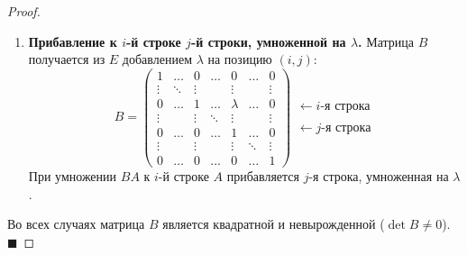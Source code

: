 \begin{proof}
\begin{enumerate}
    \item \textbf{Прибавление к $i$-й строке $j$-й строки, умноженной на $\lambda$.} 
    Матрица $B$ получается из $E$ добавлением $\lambda$ на позицию $(i, j)$:
    $$
    B = \begin{pmatrix}
    1 & \dots & 0 & \dots & 0 & \dots & 0 \\
    \vdots & \ddots & \vdots & & \vdots & & \vdots \\
    0 & \dots & 1 & \dots & \lambda & \dots & 0 \\
    \vdots & & \vdots & \ddots & \vdots & & \vdots \\
    0 & \dots & 0 & \dots & 1 & \dots & 0 \\
    \vdots & & \vdots & & \vdots & \ddots & \vdots \\
    0 & \dots & 0 & \dots & 0 & \dots & 1
    \end{pmatrix}
    \begin{matrix}
    \\ \\ \leftarrow i\text{-я строка} \\ \\ \leftarrow j\text{-я строка} \\ \\
    \end{matrix}
    $$
    При умножении $BA$ к $i$-й строке $A$ прибавляется $j$-я строка, умноженная на $\lambda$.
\end{enumerate}
Во всех случаях матрица $B$ является квадратной и невырожденной ($\det B \neq 0$).
\hfill$\blacksquare$
\end{proof}
